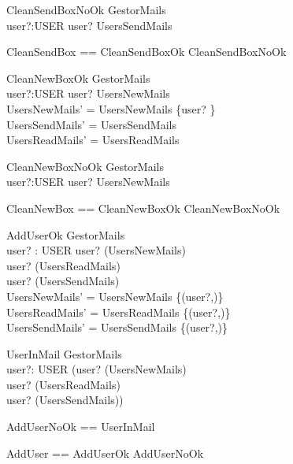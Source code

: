 \begin{schema}{CleanSendBoxNoOk}
\Xi GestorMails \\
user?:USER
\where
user? \notin \dom UsersSendMails \\
\end{schema}


\begin{zed}
CleanSendBox == CleanSendBoxOk \lor CleanSendBoxNoOk \\
\end{zed}

\begin{schema}{CleanNewBoxOk}
\Delta GestorMails\\
user?:USER
\where
user? \in \dom UsersNewMails \\
UsersNewMails' =  UsersNewMails \oplus \{user? \mapsto \emptyset  \} \\
UsersSendMails' = UsersSendMails \\
UsersReadMails' = UsersReadMails
\end{schema}

\begin{schema}{CleanNewBoxNoOk}
\Xi GestorMails \\
user?:USER
\where
user? \notin \dom UsersNewMails \\
\end{schema}

\begin{zed}
CleanNewBox == CleanNewBoxOk \lor CleanNewBoxNoOk \\
\end{zed}

\begin{schema}{AddUserOk}
\Delta GestorMails \\
user? : USER
\where
user? \notin \dom(UsersNewMails) \\
user? \notin \dom(UsersReadMails) \\
user? \notin \dom(UsersSendMails) \\

UsersNewMails' = UsersNewMails \cup \{(user?,\emptyset)\} \\
UsersReadMails' = UsersReadMails \cup \{(user?,\emptyset)\} \\
UsersSendMails' = UsersSendMails \cup \{(user?,\emptyset)\} 
\end{schema}

\begin{schema}{UserInMail}
\Xi GestorMails \\
user?: USER
\where
(user? \in \dom(UsersNewMails)\\
\lor
user? \in \dom(UsersReadMails) \\
\lor
user? \in \dom(UsersSendMails))  
\end{schema}

\begin{zed}
AddUserNoOk == UserInMail \\
\end{zed}
\begin{zed}
AddUser == AddUserOk \lor AddUserNoOk\\
\end{zed}